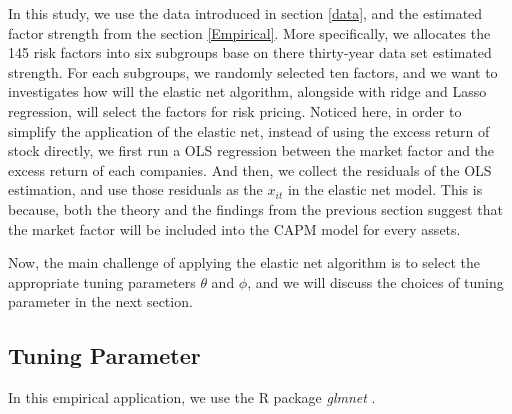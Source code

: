 In this study, we use the data introduced in section \ref{data}, and the estimated factor strength from the section \ref{Empirical}.
More specifically, we allocates the 145 risk factors into six subgroups base on there thirty-year data set estimated strength.
For each subgroups, we randomly selected ten factors, and we want to investigates how will the elastic net algorithm, alongside with ridge and Lasso regression, will select the factors for risk pricing.
Noticed here, in order to simplify the application of the elastic net, instead of using the excess return of stock directly, we first run a OLS regression between the market factor and the excess return of each companies.
And then, we collect the residuals of the OLS estimation, and use those residuals as the $x_{it}$ in the elastic net model.
This is because, both the theory and the findings from the previous section suggest that the market factor will be included into the CAPM model for every assets.

Now, the main challenge of applying the elastic net algorithm is to select the appropriate tuning parameters $\theta$ and $\phi$, and we will discuss the choices of tuning parameter in the next section.


\subsection{Tuning Parameter} \label{EN:parameter_tuning }
In this empirical application, we use the R package \textit{glmnet} \cite{Friedman2010, Simon2011}.

